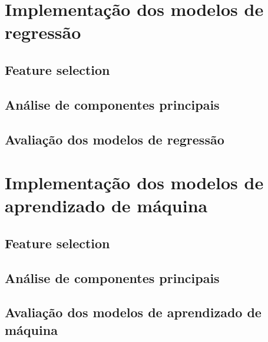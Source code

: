\section{Implementação dos modelos de regressão}


\subsection{Feature selection}


\subsection{Análise de componentes principais}


\subsection{Avaliação dos modelos de regressão}


\section{Implementação dos modelos de aprendizado de máquina}


\subsection{Feature selection}


\subsection{Análise de componentes principais}


\subsection{Avaliação dos modelos de aprendizado de máquina}
